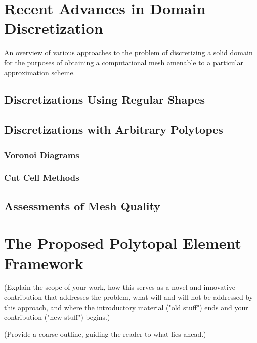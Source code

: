 \section{Recent Advances in Domain Discretization}
%
An overview of various approaches to the problem of discretizing a solid domain for the purposes of obtaining a computational mesh amenable to a particular approximation scheme.
\subsection{Discretizations Using Regular Shapes}

\subsection{Discretizations with Arbitrary Polytopes}
\subsubsection{Voronoi Diagrams}
\subsubsection{Cut Cell Methods}

\subsection{Assessments of Mesh Quality}

\section{The Proposed Polytopal Element Framework}

(Explain the scope of your work, how this serves as a novel and innovative contribution that addresses the problem, what will and will not be addressed by this approach, and where the introductory material ("old stuff") ends and your contribution ("new stuff") begins.)

(Provide a coarse outline, guiding the reader to what lies ahead.)
